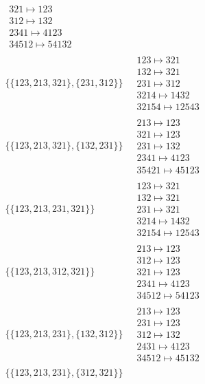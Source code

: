 \begin{scriptsize}
\begin{align}
\begin{matrix}
321 \mapsto 123
\\
312 \mapsto 132
\\
2341 \mapsto 4123
\\
34512 \mapsto 54132
\end{matrix}
\\
\{\{123, 213, 321\}, \{231, 312\}\}
\ 
&
\begin{matrix}
123 \mapsto 321
\\
132 \mapsto 321
\\
231 \mapsto 312
\\
3214 \mapsto 1432
\\
32154 \mapsto 12543
\end{matrix}
\\
\{\{123, 213, 321\}, \{132, 231\}\}
\ 
&
\begin{matrix}
213 \mapsto 123
\\
321 \mapsto 123
\\
231 \mapsto 132
\\
2341 \mapsto 4123
\\
35421 \mapsto 45123
\end{matrix}
\\
\{\{123, 213, 231, 321\}\}
\ 
&
\begin{matrix}
123 \mapsto 321
\\
132 \mapsto 321
\\
231 \mapsto 321
\\
3214 \mapsto 1432
\\
32154 \mapsto 12543
\end{matrix}
\\
\{\{123, 213, 312, 321\}\}
\ 
&
\begin{matrix}
213 \mapsto 123
\\
312 \mapsto 123
\\
321 \mapsto 123
\\
2341 \mapsto 4123
\\
34512 \mapsto 54123
\end{matrix}
\\
\{\{123, 213, 231\}, \{132, 312\}\}
\ 
&
\begin{matrix}
213 \mapsto 123
\\
231 \mapsto 123
\\
312 \mapsto 132
\\
2431 \mapsto 4123
\\
34512 \mapsto 45132
\end{matrix}
\\
\{\{123, 213, 231\}, \{312, 321\}\}
\ 
&
\begin{matrix}

\end{matrix}
\end{align}
\end{scriptsize}

